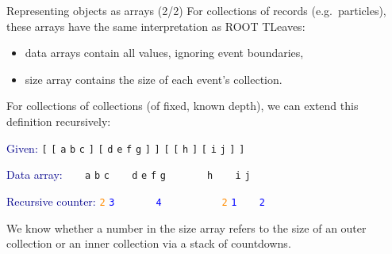 \documentclass{beamer}
\begin{document}
\begin{frame}{Representing objects as arrays (2/2)}
\vspace{0.3 cm}
For collections of records (e.g.\ particles), these arrays have the same interpretation as ROOT TLeaves:
\begin{itemize}
\item data arrays contain all values, ignoring event boundaries,
\item size array contains the size of each event's collection.
\end{itemize}

\vfill
For collections of collections (of fixed, known depth), we can extend this definition recursively:

\vspace{0.3 cm}
\textcolor{darkblue}{Given:} \hfill {\tt [} {\tt [} {\tt a} {\tt b} {\tt c} {\tt ]} {\tt [} {\tt d} {\tt e} {\tt f} {\tt g} {\tt ]} {\tt ]} {\tt [} {\tt [} {\tt h} {\tt ]} {\tt [} {\tt i} {\tt j} {\tt ]} {\tt ]}

\textcolor{darkblue}{Data array:} \hfill {\tt \ } {\tt \ } {\tt a} {\tt b} {\tt c} {\tt \ } {\tt \ } {\tt d} {\tt e} {\tt f} {\tt g} {\tt \ } {\tt \ } {\tt \ } {\tt \ } {\tt h} {\tt \ } {\tt \ } {\tt i} {\tt j} {\tt \ } {\tt \ }

\textcolor{darkblue}{Recursive counter:} \hfill \textcolor{darkorange}{\tt 2} \textcolor{blue}{\tt 3} {\tt \ } {\tt \ } {\tt \ } {\tt \ } \textcolor{blue}{\tt 4} {\tt \ } {\tt \ } {\tt \ } {\tt \ } {\tt \ } {\tt \ } \textcolor{darkorange}{\tt 2} \textcolor{blue}{\tt 1} {\tt \ } {\tt \ } \textcolor{blue}{\tt 2} {\tt \ } {\tt \ } {\tt \ } {\tt \ }

\vspace{0.3 cm}
We know whether a number in the size array refers to the size of an outer collection or an inner collection via a stack of countdowns.
\end{frame}
\end{document}
